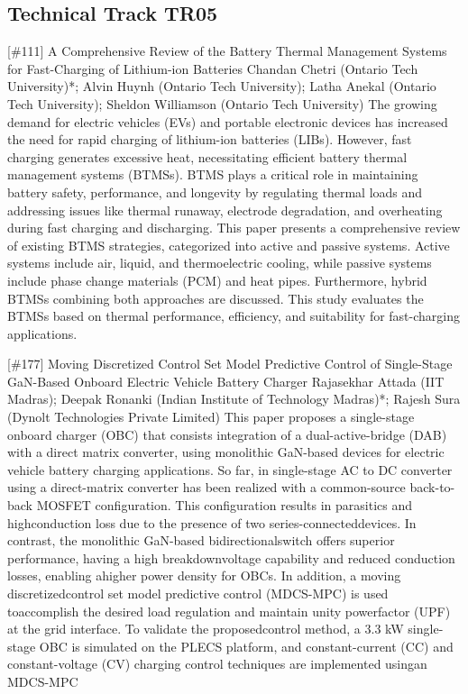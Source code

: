 \clearpage \subsection{Technical Track TR05}\nopagebreak {} \begin{abstract_online} {[\#111] A Comprehensive Review of the Battery Thermal Management Systems for Fast-Charging of Lithium-ion Batteries} {} {Chandan Chetri (Ontario Tech University)*; Alvin Huynh (Ontario Tech University); Latha Anekal (Ontario Tech University); Sheldon Williamson (Ontario Tech University)} {} The growing demand for electric vehicles (EVs) and portable electronic devices has increased the need for rapid charging of lithium-ion batteries (LIBs). However, fast charging generates excessive heat, necessitating efficient battery thermal management systems (BTMSs). BTMS plays a critical role in maintaining battery safety, performance, and longevity by regulating thermal loads and addressing issues like thermal runaway, electrode degradation, and overheating during fast charging and discharging. This paper presents a comprehensive review of existing BTMS strategies, categorized into active and passive systems. Active systems include air, liquid, and thermoelectric cooling, while passive systems include phase change materials (PCM) and heat pipes. Furthermore, hybrid BTMSs combining both approaches are discussed. This study evaluates the BTMSs based on thermal performance, efficiency, and suitability for fast-charging applications. \end{abstract_online} 
{} \begin{abstract_online} {[\#177] Moving Discretized Control Set Model Predictive Control of Single-Stage GaN-Based Onboard Electric Vehicle Battery Charger} {} {Rajasekhar Attada (IIT Madras); Deepak  Ronanki (Indian Institute of Technology Madras)*; Rajesh Sura (Dynolt Technologies Private Limited)} {} This paper proposes a single-stage onboard charger (OBC) that consists integration of a dual-active-bridge (DAB) with a direct matrix converter, using monolithic GaN-based devices for electric vehicle battery charging applications. So far, in single-stage AC to DC converter using a direct-matrix converter has been realized with a common-source back-to-back MOSFET configuration. This configuration results in parasitics and highconduction loss due to the presence of two series-connecteddevices. In contrast, the monolithic GaN-based bidirectionalswitch offers superior performance, having a high breakdownvoltage capability and reduced conduction losses, enabling ahigher power density for OBCs. In addition, a moving discretizedcontrol set model predictive control (MDCS-MPC) is used toaccomplish the desired load regulation and maintain unity powerfactor (UPF) at the grid interface. To validate the proposedcontrol method, a 3.3 kW single-stage OBC is simulated on the PLECS platform, and constant-current (CC) and constant-voltage (CV) charging control techniques are implemented usingan MDCS-MPC \end{abstract_online} 
